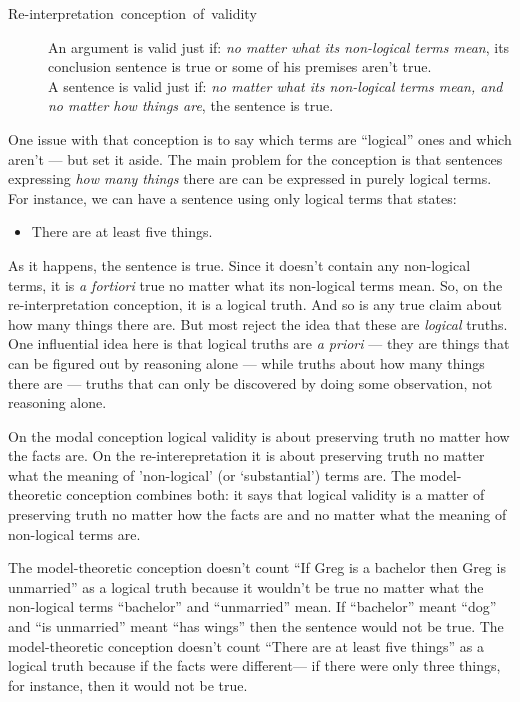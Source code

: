 \documentclass[../../../include/open-logic-part]{subfiles}
\begin{document}
\begin{description} \item [{Re-interpretation~conception~of~validity}]
An argument is valid just if: \emph{no matter what its non-logical
terms mean}, its conclusion sentence is true or some of his premises
aren't true. \\ A sentence is valid just if: \emph{no matter what its
non-logical terms mean, and no matter how things are}, the sentence is
true.  \end{description}

One issue with that conception is to say which terms are ``logical''
ones and which aren't --- but set it aside. The main problem for the
conception is that sentences expressing \emph{how many things} there
are can be expressed in purely logical terms. For instance, we can
have a sentence using only logical terms that states: 

\begin{itemize} \item There are at least five things. \end{itemize}

As it happens, the sentence is true. Since it doesn't contain any
non-logical terms, it is \emph{a fortiori} true no matter what its
non-logical terms mean. So, on the re-interpretation conception, it is
a logical truth. And so is any true claim about how many things there
are. But most reject the idea that these are \emph{logical} truths.
One influential idea here is that logical truths are \emph{a priori}
--- they are things that can be figured out by reasoning alone ---
while truths about how many things there are --- truths that can only
be discovered by doing some observation, not reasoning alone. 

On the modal conception logical validity is about preserving truth no
matter how the facts are. On the re-interepretation it is about
preserving truth no matter what the meaning of 'non-logical' (or
`substantial') terms are. The model-theoretic conception combines
both: it says that logical validity is a matter of preserving truth no
matter how the facts are and no matter what the meaning of non-logical
terms are. 

The model-theoretic conception doesn't count ``If Greg is a bachelor
then Greg is unmarried'' as a logical truth because it wouldn't be
true no matter what the non-logical terms ``bachelor'' and
``unmarried'' mean. If ``bachelor'' meant ``dog'' and ``is unmarried''
meant ``has wings'' then the sentence would not be true. The
model-theoretic conception doesn't count ``There are at least five
things'' as a logical truth because if the facts were different--- if
there were only three things, for instance, then it would not be true.
\end{document}
